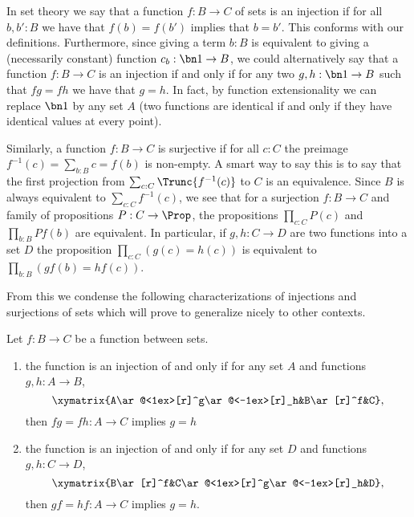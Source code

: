 In set theory we say that a function $f:B\to C$ of sets is an injection if for all $b,b':B$ we have that $f(b)=f(b')$ implies that  $b=b'$.  This conforms with our definitions.
Furthermore, since giving a term $b:B$ is equivalent to giving a (necessarily constant) function $c_b:\bn 1\to B$, we could alternatively say that a function $f:B\to C$ is an injection if and only if for any two $g,h:\bn 1\to B$ such that $fg=fh$ we have that $g=h$.  In fact, by function extensionality we can replace $\bn 1$ by any set $A$ (two functions are identical if and only if they have identical values at every point).

Similarly, a function $f:B\to C$ is surjective if for all $c:C$ the preimage $f^{-1}(c)=\sum_{b:B}c=f(b)$ is non-empty.  A smart way to say this is to say that the first projection from $\sum_{c:C}\Trunc{f^{-1}(c)}$ to $C$ is an equivalence.  Since $B$ is always equivalent to $\sum_{c:C}f^{-1}(c)$, we see that for a surjection $f:B\to C$ and family of propositions $P:C\to \Prop$, the propositions $\prod_{c:C}P(c)$ and $\prod_{b:B}Pf(b)$ are equivalent.  In particular, if $g,h:C\to D$ are two functions into a set $D$ the proposition $\prod_{c:C}(g(c)=h(c))$ is equivalent to $\prod_{b:B}(gf(b)=hf(c))$.

From this we condense the following characterizations of injections and surjections of sets which will prove to generalize nicely to other contexts.
\begin{lemma}
  \label{lem:injofsetsaremono}Let $f:B\to C$ be a function between sets.
  \begin{enumerate}
  \item the function is an injection of and only if for any set $A$ and functions $g,h:A\to B$,
$$\xymatrix{A\ar@<1ex>[r]^g\ar@<-1ex>[r]_h&B\ar[r]^f&C},$$  then $fg=fh:A\to C$ implies $g=h$
\item the function is an injection of and only if for any set $D$ and functions $g,h:C\to D$,
$$\xymatrix{B\ar[r]^f&C\ar@<1ex>[r]^g\ar@<-1ex>[r]_h&D},$$  then $gf=hf:A\to C$ implies $g=h$.
  \end{enumerate}
\end{lemma}


